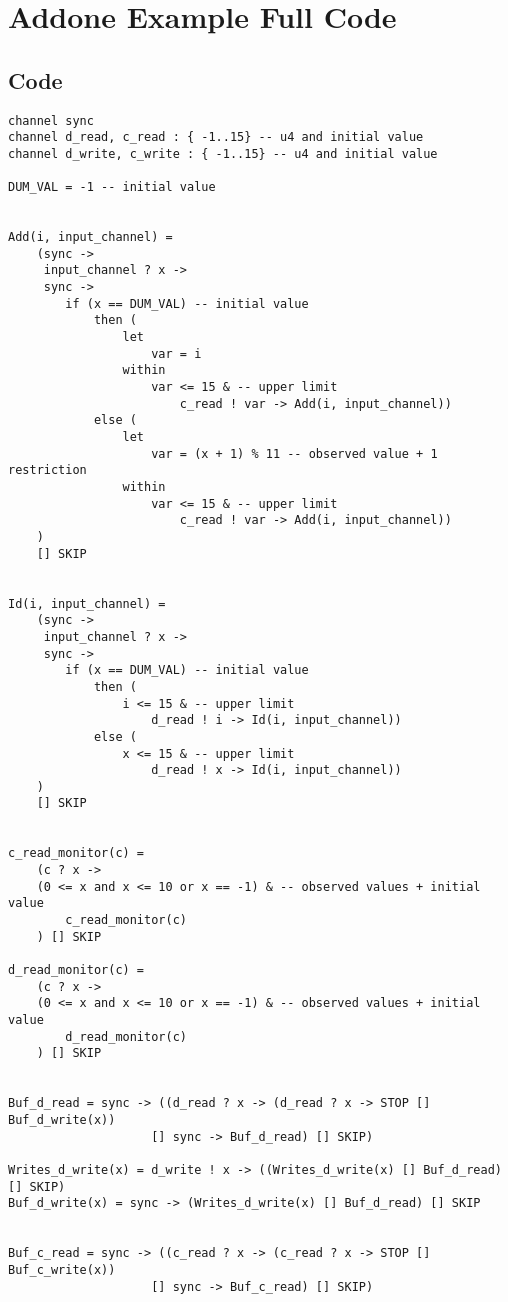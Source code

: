 \chapter{Addone Example Full \cspm Code}
\label{app:addone}
\section*{\cspm{} Code}
\begin{verbatim}
channel sync
channel d_read, c_read : { -1..15} -- u4 and initial value
channel d_write, c_write : { -1..15} -- u4 and initial value

DUM_VAL = -1 -- initial value


Add(i, input_channel) =
    (sync ->
     input_channel ? x ->
     sync ->
        if (x == DUM_VAL) -- initial value
            then (
                let
                    var = i
                within
                    var <= 15 & -- upper limit
                        c_read ! var -> Add(i, input_channel))
            else (
                let
                    var = (x + 1) % 11 -- observed value + 1 restriction
                within
                    var <= 15 & -- upper limit
                        c_read ! var -> Add(i, input_channel))
    )
    [] SKIP


Id(i, input_channel) =
    (sync ->
     input_channel ? x ->
     sync ->
        if (x == DUM_VAL) -- initial value
            then (
                i <= 15 & -- upper limit
                    d_read ! i -> Id(i, input_channel))
            else (
                x <= 15 & -- upper limit
                    d_read ! x -> Id(i, input_channel))
    )
    [] SKIP


c_read_monitor(c) =
    (c ? x ->
    (0 <= x and x <= 10 or x == -1) & -- observed values + initial value
        c_read_monitor(c)
    ) [] SKIP

d_read_monitor(c) =
    (c ? x ->
    (0 <= x and x <= 10 or x == -1) & -- observed values + initial value
        d_read_monitor(c)
    ) [] SKIP


Buf_d_read = sync -> ((d_read ? x -> (d_read ? x -> STOP [] Buf_d_write(x))
                    [] sync -> Buf_d_read) [] SKIP)

Writes_d_write(x) = d_write ! x -> ((Writes_d_write(x) [] Buf_d_read) [] SKIP)
Buf_d_write(x) = sync -> (Writes_d_write(x) [] Buf_d_read) [] SKIP


Buf_c_read = sync -> ((c_read ? x -> (c_read ? x -> STOP [] Buf_c_write(x))
                    [] sync -> Buf_c_read) [] SKIP)


\end{verbatim}
